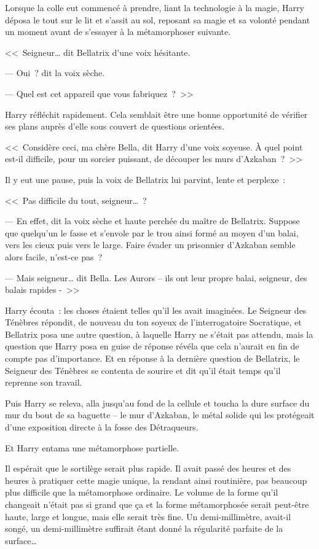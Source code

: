 Lorsque la colle eut commencé à prendre, liant la technologie à la magie, Harry déposa le tout sur le lit et s'assit au sol, reposant sa magie et sa volonté pendant un moment avant de s'essayer à la métamorphoser suivante.

<<~Seigneur… dit Bellatrix d'une voix hésitante.

--- Oui~? dit la voix sèche.

--- Quel est cet appareil que vous fabriquez~?~>>

Harry réfléchit rapidement. Cela semblait être une bonne opportunité de vérifier ses plans auprès d'elle sous couvert de questions orientées.

<<~Considère ceci, ma chère Bella, dit Harry d'une voix soyeuse. À quel point est-il difficile, pour un sorcier puissant, de découper les murs d'Azkaban~?~>>

Il y eut une pause, puis la voix de Bellatrix lui parvint, lente et perplexe~:

<<~Pas difficile du tout, seigneur…~?

--- En effet, dit la voix sèche et haute perchée du maître de Bellatrix. Suppose que quelqu'un le fasse et s'envole par le trou ainsi formé au moyen d'un balai, vers les cieux puis vers le large. Faire évader un prisonnier d'Azkaban semble alors facile, n'est-ce pas~?

--- Mais seigneur… dit Bella. Les Aurors -- ils ont leur propre balai, seigneur, des balais rapides -~>>

Harry écouta~: les choses étaient telles qu'il les avait imaginées. Le Seigneur des Ténèbres répondit, de nouveau du ton soyeux de l'interrogatoire Socratique, et Bellatrix posa une autre question, à laquelle Harry ne s'était pas attendu, mais la question que Harry posa en guise de réponse révéla que cela n'aurait en fin de compte pas d'importance. Et en réponse à la dernière question de Bellatrix, le Seigneur des Ténèbres se contenta de sourire et dit qu'il était temps qu'il reprenne son travail.

Puis Harry se releva, alla jusqu'au fond de la cellule et toucha la dure surface du mur du bout de sa baguette -- le mur d'Azkaban, le métal solide qui les protégeait d'une exposition directe à la fosse des Détraqueurs.

Et Harry entama une métamorphose partielle.

Il espérait que le sortilège serait plus rapide. Il avait passé des heures et des heures à pratiquer cette magie unique, la rendant ainsi routinière, pas beaucoup plus difficile que la métamorphose ordinaire. Le volume de la forme qu'il changeait n'était pas si grand que ça et la forme métamorphosée serait peut-être haute, large et longue, mais elle serait très fine. Un demi-millimètre, avait-il songé, un demi-millimètre suffirait étant donné la régularité parfaite de la surface…

